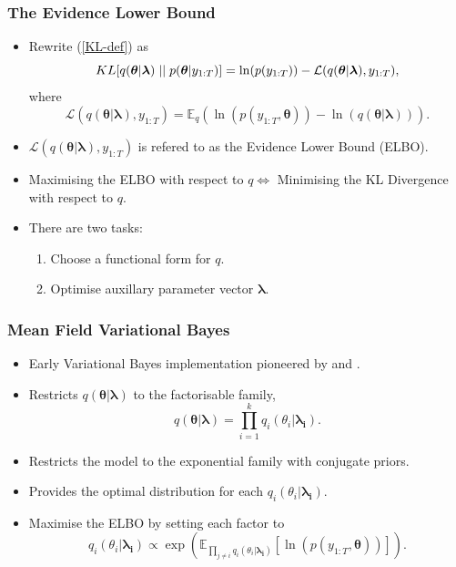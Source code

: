 \documentclass{beamer}\usepackage[]{graphicx}\usepackage[]{color}
\begin{document}
\begin{frame}
\frametitle{The Evidence Lower Bound}
\begin{itemize}
\item Rewrite (\ref{KL-def}) as
\begin{equation}
\label{KL-ELBO}
KL[q(\boldsymbol{\theta} | \boldsymbol{\lambda})\hspace{.1cm}||\hspace{.1cm}p(\boldsymbol{\theta} |y_{1:T})] = \ln(p(y_{1:T})) - \mathcal{L}(q(\boldsymbol{\theta} | \boldsymbol{\lambda}), y_{1:T}),
\end{equation}
where
\begin{equation}
\label{ELBO}
\mathcal{L}(q(\boldsymbol{\theta} | \boldsymbol{\lambda}), y_{1:T}) = \mathbb{E}_{q} \left( \ln (p(y_{1:T},\boldsymbol{\theta})) - \ln (q(\boldsymbol{\theta} | \boldsymbol{\lambda})) \right).
\end{equation}
\item $\mathcal{L}(q(\boldsymbol{\theta} | \boldsymbol{\lambda}), y_{1:T})$ is refered to as the Evidence Lower Bound (ELBO).
\item Maximising the ELBO with respect to $q \iff$ Minimising the KL Divergence with respect to $q$.
\item There are two tasks: 
  \begin{enumerate}
  \item Choose a functional form for $q$. 
  \item Optimise auxillary parameter vector $\boldsymbol{\lambda}$. 
  \end{enumerate}
\end{itemize}
\end{frame}


\begin{frame}
\frametitle{Mean Field Variational Bayes}
\begin{itemize}
\item Early Variational Bayes implementation pioneered by \citet{Jordan1999} and \citet{Ghahramani2000}.
\item Restricts $q(\boldsymbol{\theta} | \boldsymbol{\lambda})$ to the factorisable family,
\begin{equation}
\label{mf1}
q(\boldsymbol{\theta} | \boldsymbol{\lambda}) = \prod_{i=1}^k q_i(\theta_i | \boldsymbol{\lambda_i}).
\end{equation}
\item Restricts the model to the exponential family with conjugate priors.
\item Provides the optimal distribution for each $q_i(\theta_i | \boldsymbol{\lambda_i})$.
\item Maximise the ELBO by setting each factor to
\begin{equation}
\label{mf2}
q_i(\theta_i |\boldsymbol{\lambda_i}) \propto\exp( \mathbb{E}_{\prod_{j \neq i} q_i(\theta_i | \boldsymbol{\lambda_i})} [\ln(p(y_{1:T},\boldsymbol{\theta}))]).
\end{equation}
\end{itemize}
\end{frame}
\end{document}
